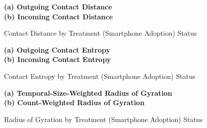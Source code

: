 \begin{figure}[ht!]
\centering
\caption{Contact Distance by Treatment (Smartphone Adoption) Status}
\vspace{0.3cm}


\textbf{(a) Outgoing Contact Distance}\\


\vspace{0.3cm}
\textbf{(b) Incoming Contact Distance}\\


\label{fig:effect_of_smartphone_adoption_on_incoming_contact_distance}
\end{figure}


\begin{figure}[ht!]
\centering
\caption{Contact Entropy by Treatment (Smartphone Adoption) Status}
\vspace{0.3cm}

\textbf{(a) Outgoing Contact Entropy}\\


\vspace{0.3cm}
\textbf{(b) Incoming Contact Entropy}\\


\label{fig:effect_of_smartphone_adoption_on_outgoing_incoming_contact_entropy}
\end{figure}


\begin{figure}[ht!]
\centering
\caption{Radius of Gyration by Treatment (Smartphone Adoption) Status}
\vspace{0.3cm}

\textbf{(a) Temporal-Size-Weighted Radius of Gyration}\\


\vspace{0.3cm}
\textbf{(b) Count-Weighted Radius of Gyration}\\


\label{fig:effect_of_smartphone_adoption_on_temporal_size_weighted_count_weighted_radius_of_gyration}
\end{figure}


